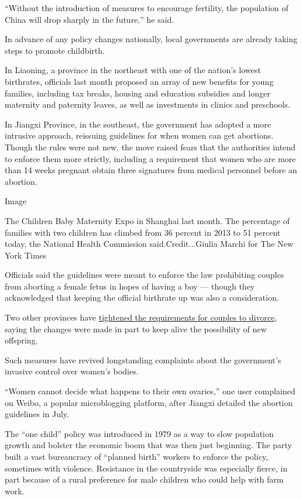 ``Without the introduction of measures to encourage fertility, the
population of China will drop sharply in the future,'' he said.

In advance of any policy changes nationally, local governments are
already taking steps to promote childbirth.

In Liaoning, a province in the northeast with one of the nation's lowest
birthrates, officials last month proposed an array of new benefits for
young families, including tax breaks, housing and education subsidies
and longer maternity and paternity leaves, as well as investments in
clinics and preschools.

In Jiangxi Province, in the southeast, the government has adopted a more
intrusive approach, reissuing guidelines for when women can get
abortions. Though the rules were not new, the move raised fears that the
authorities intend to enforce them more strictly, including a
requirement that women who are more than 14 weeks pregnant obtain three
signatures from medical personnel before an abortion.

Image

The Children Baby Maternity Expo in Shanghai last month. The percentage
of families with two children has climbed from 36 percent in 2013 to 51
percent today, the National Health Commission said.Credit...Giulia
Marchi for The New York Times

Officials said the guidelines were meant to enforce the law prohibiting
couples from aborting a female fetus in hopes of having a boy --- though
they acknowledged that keeping the official birthrate up was also a
consideration.

Two other provinces have
\href{https://www.nytimes3xbfgragh.onion/2018/05/30/world/asia/china-divorce-quiz.html}{tightened
the requirements for couples to divorce}, saying the changes were made
in part to keep alive the possibility of new offspring.

Such measures have revived longstanding complaints about the
government's invasive control over women's bodies.

``Women cannot decide what happens to their own ovaries,'' one user
complained on Weibo, a popular microblogging platform, after Jiangxi
detailed the abortion guidelines in July.

The ``one child'' policy was introduced in 1979 as a way to slow
population growth and bolster the economic boom that was then just
beginning. The party built a vast bureaucracy of ``planned birth''
workers to enforce the policy, sometimes with violence. Resistance in
the countryside was especially fierce, in part because of a rural
preference for male children who could help with farm work.

